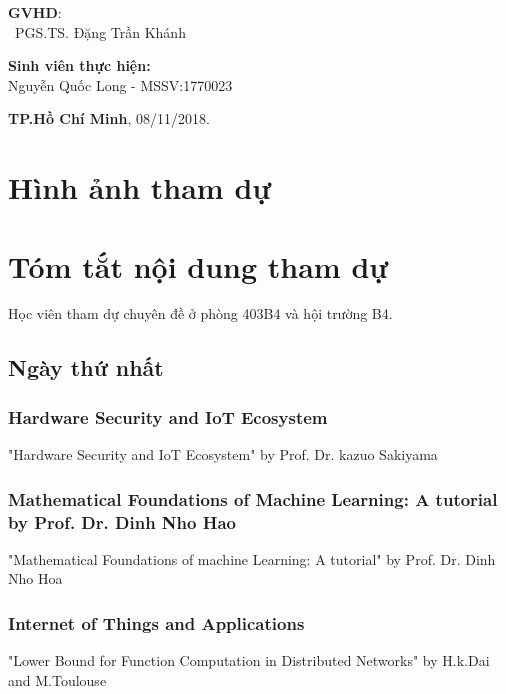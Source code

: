 \documentclass{hcmutarticle}
\begin{document}
\vspace{2cm}

\begin{minipage}[t]{0.60\linewidth}
\textbf{GVHD}: \\
\ PGS.TS. Đặng Trần Khánh
\end{minipage}
\begin{minipage}[t]{0.40\linewidth}
\textbf{Sinh viên thực hiện:}\\
Nguyễn Quốc Long - MSSV:1770023
\end{minipage}

\vspace{4cm}

\begin{center}

\textbf{TP.Hồ Chí Minh},
08/11/2018.

\end{center}



\newpage

\tableofcontents 

\newpage

\section{Hình ảnh tham dự}


\section{Tóm tắt nội dung tham dự}\label{survey}
Học viên tham dự chuyên đề ở phòng 403B4 và hội trường B4.
\subsection{Ngày thứ nhất}
\subsubsection{Hardware Security and IoT Ecosystem}
"Hardware Security and IoT Ecosystem" by Prof. Dr. kazuo Sakiyama
\subsubsection{Mathematical Foundations of Machine Learning: A tutorial by Prof. Dr. Dinh Nho Hao}
"Mathematical Foundations of machine Learning: A tutorial" by Prof. Dr. Dinh Nho Hoa
\subsubsection{Internet of Things and Applications}
"Lower Bound for Function Computation in Distributed Networks" by H.k.Dai and M.Toulouse
\end{document}
